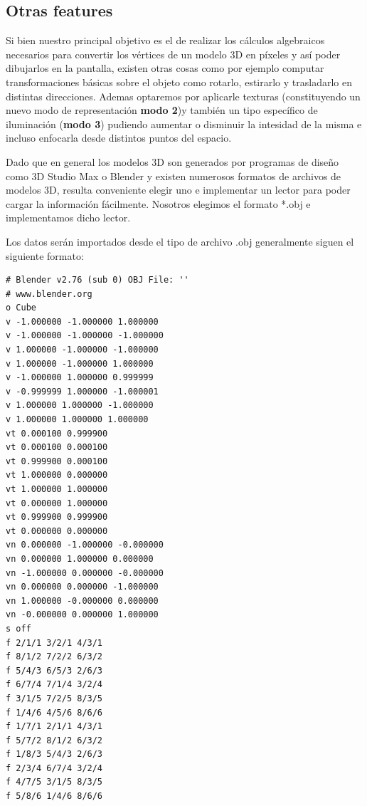 \documentclass[a4paper]{article}
\begin{document}
\subsection{Otras features}

Si bien nuestro principal objetivo es el de realizar los cálculos algebraicos necesarios para convertir los vértices de un modelo 3D en píxeles y así poder dibujarlos en la pantalla, existen otras cosas como por ejemplo computar transformaciones básicas sobre el objeto como rotarlo, estirarlo y trasladarlo en distintas direcciones. Ademas optaremos por aplicarle texturas (constituyendo un nuevo modo de representación \textbf{modo 2})y también un tipo específico de iluminación (\textbf{modo 3}) pudiendo aumentar o disminuir la intesidad de la misma e incluso enfocarla desde distintos puntos del espacio.
\par Dado que en general los modelos 3D son generados por programas de diseño como 3D Studio Max o Blender y existen numerosos formatos de archivos de modelos 3D, resulta conveniente elegir uno e implementar un lector para poder cargar la información fácilmente. Nosotros elegimos el formato *.obj e implementamos dicho lector.

Los datos serán importados desde el tipo de archivo .obj generalmente siguen el siguiente formato:  

\begin{verbatim}
# Blender v2.76 (sub 0) OBJ File: ''
# www.blender.org
o Cube
v -1.000000 -1.000000 1.000000
v -1.000000 -1.000000 -1.000000
v 1.000000 -1.000000 -1.000000
v 1.000000 -1.000000 1.000000
v -1.000000 1.000000 0.999999
v -0.999999 1.000000 -1.000001
v 1.000000 1.000000 -1.000000
v 1.000000 1.000000 1.000000
vt 0.000100 0.999900
vt 0.000100 0.000100
vt 0.999900 0.000100
vt 1.000000 0.000000
vt 1.000000 1.000000
vt 0.000000 1.000000
vt 0.999900 0.999900
vt 0.000000 0.000000
vn 0.000000 -1.000000 -0.000000
vn 0.000000 1.000000 0.000000
vn -1.000000 0.000000 -0.000000
vn 0.000000 0.000000 -1.000000
vn 1.000000 -0.000000 0.000000
vn -0.000000 0.000000 1.000000
s off
f 2/1/1 3/2/1 4/3/1
f 8/1/2 7/2/2 6/3/2
f 5/4/3 6/5/3 2/6/3
f 6/7/4 7/1/4 3/2/4
f 3/1/5 7/2/5 8/3/5
f 1/4/6 4/5/6 8/6/6
f 1/7/1 2/1/1 4/3/1
f 5/7/2 8/1/2 6/3/2
f 1/8/3 5/4/3 2/6/3
f 2/3/4 6/7/4 3/2/4
f 4/7/5 3/1/5 8/3/5
f 5/8/6 1/4/6 8/6/6
\end{verbatim} 
\end{document}
